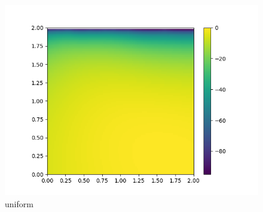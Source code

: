 \documentclass[english]{scrartcl}
\begin{document}
\begin{figure}[H]
	\includegraphics[width=\linewidth]{lighthouse/2d/unif_n=64}
	\caption{uniform} 
	\endminipage \hfill
\end{figure}
\end{document}
